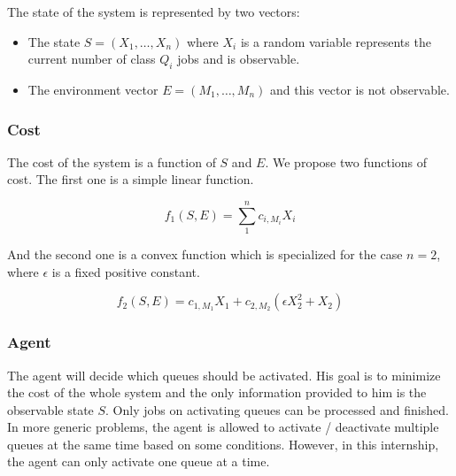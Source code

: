 \documentclass[
  a4paper, xcolor = usenames,dvipsnames]{article}
\providecommand{\tightlist}{%
  \setlength{\itemsep}{0pt}\setlength{\parskip}{0pt}}
\theoremstyle{definition}
\theoremstyle{definition}
\theoremstyle{definition}
\theoremstyle{definition}
\theoremstyle{remark}
\begin{document}
The state of the system is represented by two vectors:

\begin{itemize}
\tightlist
\item
  The state \(S = (X_{1}, \dots, X_{n})\) where \(X_{i}\) is a random variable represents the current number of class \(Q_{i}\) jobs and is observable.
\item
  The environment vector \(E = (M_{1}, \dots, M_{n})\) and this vector is not observable.
\end{itemize}

\hypertarget{cost}{%
\subsubsection{Cost}\label{cost}}

The cost of the system is a function of \(S\) and \(E\). We propose two functions of cost. The first one is a simple linear function.

\[
f_{1}(S, E) = \sum_{1}^{n} c_{i, M_{i}} X_{i}
\]

And the second one is a convex function which is specialized for the case \(n = 2\), where \(\epsilon\) is a fixed positive constant.

\[
f_{2}(S, E) = c_{1, M_{1}} X_{1} + c_{2, M_{2}} (\epsilon X_{2}^{2} + X_{2})
\]

\hypertarget{agent}{%
\subsubsection{Agent}\label{agent}}

The agent will decide which queues should be activated. His goal is to minimize the cost of the whole system and the only information provided to him is the observable state \(S\). Only jobs on activating queues can be processed and finished. In more generic problems, the agent is allowed to activate / deactivate multiple queues at the same time based on some conditions. However, in this internship, the agent can only activate one queue at a time.
\end{document}
